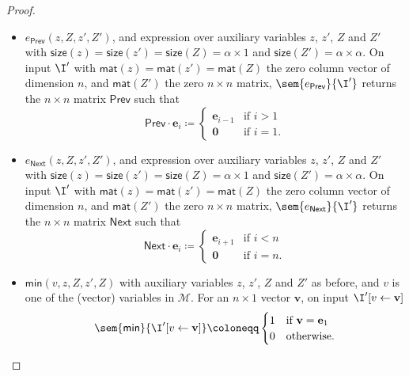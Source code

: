 \begin{proof}
\begin{itemize}
	\item $e_{\mathsf{Prev}}(z,Z,z',Z')$, and expression over auxiliary variables $z$, $z'$, $Z$ and $Z'$ with 
	$\mathsf{size}(z)=\mathsf{size}(z')=\mathsf{size}(Z)=\alpha\times 1$ and 
	$\mathsf{size}(Z')=\alpha\times\alpha$. On input $\I'$ with 
	$\mathsf{mat}(z)=\mathsf{mat}(z')=\mathsf{mat}(Z)$ the zero column vector of dimension $n$, 
	and $\mathsf{mat}(Z')$ the zero $n\times n$ matrix,
	$\sem{e_{\mathsf{Prev}}}{\I'}$ returns the $n\times n$ matrix $\mathsf{Prev}$ such that 
	$$\mathsf{Prev}\cdot \mathbf{e}_i\coloneqq \begin{cases} 
	\mathbf{e}_{i-1} & \text{if $i>1$}\\
	\mathbf{0} & \text{if $i=1$}.
	\end{cases}
	$$
	\item $e_{\mathsf{Next}}(z,Z,z',Z')$, and expression over auxiliary variables $z$, $z'$, $Z$ and $Z'$ 
	with $\mathsf{size}(z)=\mathsf{size}(z')=\mathsf{size}(Z)=\alpha\times 1$ and 
	$\mathsf{size}(Z')=\alpha\times\alpha$. On input $\I'$ with 
	$\mathsf{mat}(z)=\mathsf{mat}(z')=\mathsf{mat}(Z)$ the zero column 
	vector of dimension $n$, and $\mathsf{mat}(Z')$ the zero $n\times n$ matrix,
	$\sem{e_{\mathsf{Next}}}{\I'}$ returns the $n\times n$ matrix $\mathsf{Next}$ such that 
	$$\mathsf{Next}\cdot \mathbf{e}_i\coloneqq \begin{cases} 
	\mathbf{e}_{i+1} & \text{if $i<n$}\\
	\mathbf{0} & \text{if $i=n$}.
	\end{cases}
	$$
	\item $\textsf{min}(v,z,Z,z',Z)$ with auxiliary variables $z$, $z'$, $Z$ and $Z'$ as before, 
	and $v$ is one of the (vector) variables in $\mathcal{M}$. For an $n\times 1$ vector $\mathbf{v}$, 
	on input $\I'[v\gets \mathbf{v}]$	$$\sem{\mathsf{min}}{\I'[v\gets\mathbf{v}]}\coloneqq \begin{cases} 1 & \text{if $\mathbf{v}=\mathbf{e}_1$}\\
		0 & \text{otherwise}.
		\end{cases}$$


\end{itemize}
\end{proof}
